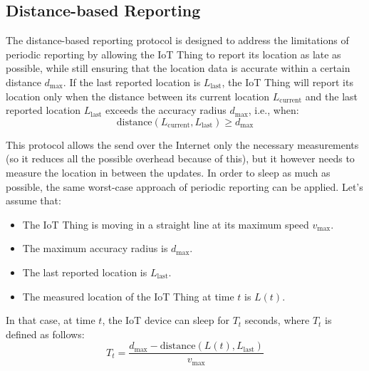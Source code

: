 \subsection{Distance-based Reporting}

The distance-based reporting protocol is designed to address the limitations of periodic reporting by allowing the IoT Thing to report its location as late as possible, while still ensuring that the location data is accurate within a certain distance $d_{\max}$. If the last reported location is $L_{\text{last}}$, the IoT Thing will report its location only when the distance between its current location $L_{\text{current}}$ and the last reported location $L_{\text{last}}$ exceeds the accuracy radius $d_{\max}$, i.e., when:
\begin{equation*}
    \text{distance}(L_{\text{current}}, L_{\text{last}}) \geq d_{\max}
\end{equation*}

This protocol allows the send over the Internet only the necessary measurements (so it reduces all the possible overhead because of this), but it however needs to measure the location in between the updates. In order to sleep as much as possible, the same worst-case approach of periodic reporting can be applied. Let's assume that:
\begin{itemize}
    \item The IoT Thing is moving in a straight line at its maximum speed $v_{\max}$.
    \item The maximum accuracy radius is $d_{\max}$.
    \item The last reported location is $L_{\text{last}}$.
    \item The measured location of the IoT Thing at time $t$ is $L(t)$.
\end{itemize}

In that case, at time $t$, the IoT device can sleep for $T_t$ seconds, where $T_t$ is defined as follows:
\begin{equation*}
    T_t = \frac{d_{\max} - \text{distance}(L(t), L_{\text{last}})}{v_{\max}}
\end{equation*}

